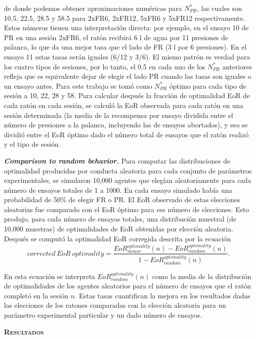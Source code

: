 \documentclass[a4paper,12pt]{article}
\begin{document}
de donde podemos obtener aproximaciones numéricas para $N_{PR}^*$, las cuales son 10.5, 22.5, 28.5 y 58.5 para 2xFR6, 2xFR12, 5xFR6 y 5xFR12 respectivamente. Estos números tienen una interpretación directa: por ejemplo, en el ensayo 10 de PR en una sesión 2xFR6, el ratón recibirá 6 \textmu l de agua por 11 presiones de palanca, lo que da una mejor tasa que el lado de FR (3 \textmu l por 6 presiones). En el ensayo 11 estas tasas serán iguales (6/12 y 3/6). El mismo patrón es verdad para los cuatro tipos de sesiones, por lo tanto, el 0.5 en cada uno de los $N_{PR}^*$ anteriores refleja que es equivalente dejar de elegir el lado PR cuando las tasas son iguales o un ensayo antes. Para este trabajo se tomó como $N_{PR}^*$ óptimo para cada tipo de sesión a 10, 22, 28 y 58. Para calcular después la fracción de optimalidad EoR de cada ratón en cada sesión, se calculó la EoR observada para cada ratón en una sesión determinada (la media de la recompensa por ensayo dividida entre el número de presiones a la palanca, incluyendo las de ensayos abortados), y eso se dividió entre el EoR óptimo dado el número total de ensayos que el ratón realizó y el tipo de sesión.

{\itshape\bfseries Comparison to random behavior.} Para computar las distribuciones de optimalidad producidas por conducta aleatoria para cada conjunto de parámetros experimentales, se simularon 10,000 agentes que elegían aleatoriamente para cada número de ensayos totales de 1 a 1000. En cada ensayo simulado había una probabilidad de 50\% de elegir FR o PR. El EoR observado de estas elecciones aleatorias fue comparado con el EoR óptimo para ese número de elecciones. Esto produjo, para cada número de ensayos totales, una distribución muestral (de 10,000 muestras) de optimalidades de EoR obtenidas por elección aleatoria. Después se computó la optimalidad EoR corregida descrita por la ecuación 
$$
corrected\ EoR\ optimality = 
\frac{
	EoR_{mouse}^{optimality}(n)
	-
	EoR_{random}^{optimality}(n)
}{
	1
	-
	EoR_{random}^{optimality}(n)
}.
$$

En esta ecuación se interpreta $EoR_{random}^{optimality}(n)$ como la media de la distribución de optimalidades de los agentes aleatorios para el número de ensayos que el ratón completó en la sesión $n$. Estas tasas cuantifican la mejora en los resultados dadas las elecciones de los ratones comparadas con la elección aleatoria para un parámetro experimental particular y un dado número de ensayos.

{\scshape\bfseries Resultados}
\end{document}
